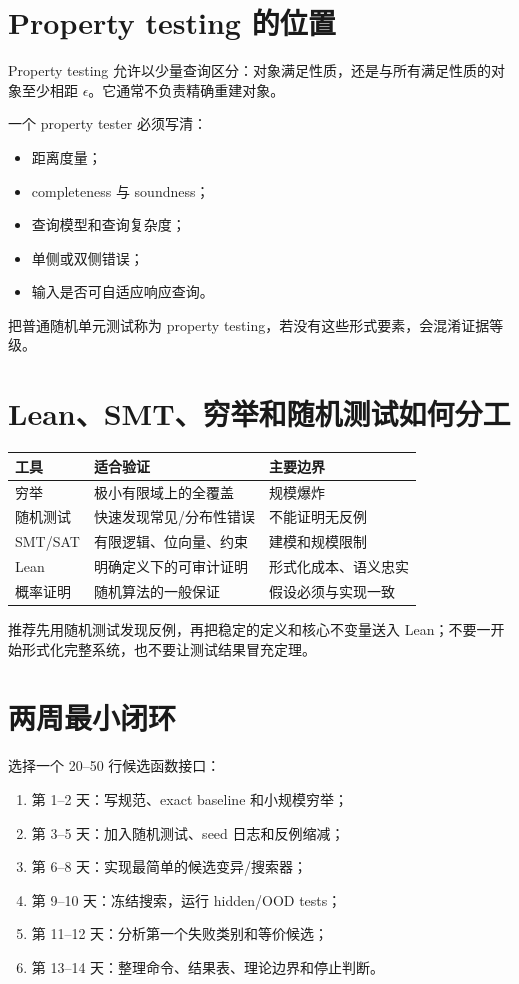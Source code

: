 \section{Property testing 的位置}

Property testing 允许以少量查询区分：对象满足性质，还是与所有满足性质的对象至少相距 $\epsilon$。它通常不负责精确重建对象。

一个 property tester 必须写清：
\begin{itemize}
  \item 距离度量；
  \item completeness 与 soundness；
  \item 查询模型和查询复杂度；
  \item 单侧或双侧错误；
  \item 输入是否可自适应响应查询。
\end{itemize}
把普通随机单元测试称为 property testing，若没有这些形式要素，会混淆证据等级。

\section{Lean、SMT、穷举和随机测试如何分工}

\begin{center}
\begin{tabularx}{\textwidth}{lXX}
\toprule
工具 & 适合验证 & 主要边界\\
\midrule
穷举 & 极小有限域上的全覆盖 & 规模爆炸\\
随机测试 & 快速发现常见/分布性错误 & 不能证明无反例\\
SMT/SAT & 有限逻辑、位向量、约束 & 建模和规模限制\\
Lean & 明确定义下的可审计证明 & 形式化成本、语义忠实\\
概率证明 & 随机算法的一般保证 & 假设必须与实现一致\\
\bottomrule
\end{tabularx}
\end{center}

推荐先用随机测试发现反例，再把稳定的定义和核心不变量送入 Lean；不要一开始形式化完整系统，也不要让测试结果冒充定理。

\section{两周最小闭环}

\begin{aibox}
选择一个 20--50 行候选函数接口：
\begin{enumerate}
  \item 第 1--2 天：写规范、exact baseline 和小规模穷举；
  \item 第 3--5 天：加入随机测试、seed 日志和反例缩减；
  \item 第 6--8 天：实现最简单的候选变异/搜索器；
  \item 第 9--10 天：冻结搜索，运行 hidden/OOD tests；
  \item 第 11--12 天：分析第一个失败类别和等价候选；
  \item 第 13--14 天：整理命令、结果表、理论边界和停止判断。
\end{enumerate}
\end{aibox}

